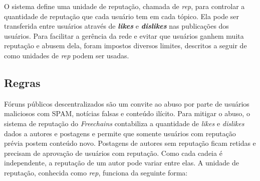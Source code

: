 \documentclass[12pt]{article}
\newcommand{\FC} {\textit{Freechains}\xspace}
\begin{document}
O sistema define uma unidade de reputação, chamada de \textit{rep}, para controlar a quantidade de reputação que cada usuário tem em cada tópico.  
Ela pode ser transferida entre usuários através de \textbf{\textit{likes}} e \textbf{\textit{dislikes}} nas publicações dos usuários.  
Para facilitar a gerência da rede e evitar que usuários ganhem muita reputação e abusem dela, foram impostos diversos limites, descritos a seguir de como unidades de \textit{rep} podem ser usadas. 

\subsection{Regras} \label{subsec:regras}

Fóruns públicos descentralizados são um convite ao abuso por parte de usuários maliciosos com SPAM, notícias falsas e conteúdo ilícito.
Para mitigar o abuso, o sistema de reputação do \FC contabiliza a quantidade de \textit{likes} e \textit{dislikes} dados a autores e postagens e permite que somente usuários com reputação prévia postem conteúdo novo.
Postagens de autores sem reputação ficam retidas e precisam de aprovação de usuários com reputação.
Como cada cadeia é independente, a reputação de um autor pode variar entre elas.
A unidade de reputação, conhecida como \textit{rep}, funciona da seguinte forma:
\end{document}
